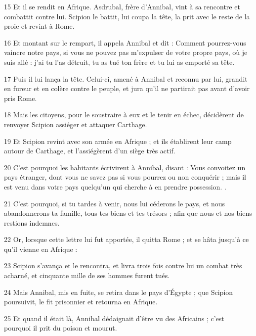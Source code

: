 \par 15 Et il se rendit en Afrique. Asdrubal, frère d'Annibal, vint à sa rencontre et combattit contre lui. Scipion le battit, lui coupa la tête, la prit avec le reste de la proie et revint à Rome.

\par 16 Et montant sur le rempart, il appela Annibal et dit : Comment pourrez-vous vaincre notre pays, si vous ne pouvez pas m'expulser de votre propre pays, où je suis allé : j'ai tu l'as détruit, tu as tué ton frère et tu lui as emporté sa tête.

\par 17 Puis il lui lança la tête. Celui-ci, amené à Annibal et reconnu par lui, grandit en fureur et en colère contre le peuple, et jura qu'il ne partirait pas avant d'avoir pris Rome.

\par 18 Mais les citoyens, pour le soustraire à eux et le tenir en échec, décidèrent de renvoyer Scipion assiéger et attaquer Carthage.

\par 19 Et Scipion revint avec son armée en Afrique ; et ils établirent leur camp autour de Carthage, et l'assiégèrent d'un siège très actif.

\par 20 C'est pourquoi les habitants écrivirent à Annibal, disant : Vous convoitez un pays étranger, dont vous ne savez pas si vous pourrez ou non conquérir ; mais il est venu dans votre pays quelqu'un qui cherche à en prendre possession. .

\par 21 C'est pourquoi, si tu tardes à venir, nous lui céderons le pays, et nous abandonnerons ta famille, tous tes biens et tes trésors ; afin que nous et nos biens restions indemnes.

\par 22 Or, lorsque cette lettre lui fut apportée, il quitta Rome ; et se hâta jusqu'à ce qu'il vienne en Afrique :

\par 23 Scipion s'avança et le rencontra, et livra trois fois contre lui un combat très acharné, et cinquante mille de ses hommes furent tués.

\par 24 Mais Annibal, mis en fuite, se retira dans le pays d'Égypte ; que Scipion poursuivit, le fit prisonnier et retourna en Afrique.

\par 25 Et quand il était là, Annibal dédaignait d'être vu des Africains ; c'est pourquoi il prit du poison et mourut.

